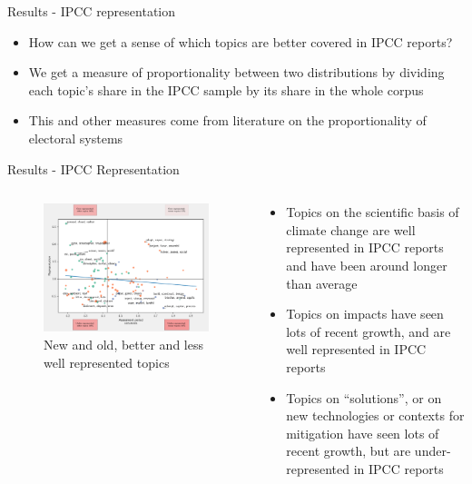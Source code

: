 \documentclass[9pt]{beamer}
\begin{document}
\begin{frame}{Results - IPCC representation}

\begin{itemize}
	\item<1-> How can we get a sense of which topics are better covered in IPCC reports?
	\item<2-> We get a measure of proportionality between two distributions by dividing each topic's share in the IPCC sample by its share in the whole corpus
	\item<3-> This and other measures come from literature on the proportionality of electoral systems \citep[e.g][]{Karpov2008}
\end{itemize}


\end{frame}

\begin{frame}{Results - IPCC Representation}

\begin{columns}
	\begin{column}{0.65\linewidth}
		\begin{figure}	
			\includegraphics[width=\linewidth]{../plots/ipcc_representation/ipcc_rep_new665_all.pdf}
			\caption{New and old, better and less well represented topics}
		\end{figure}
	\end{column}
	\begin{column}{0.35\linewidth}	
		\begin{center}
			\begin{itemize}
				\item<1-> Topics on the scientific basis of climate change are well represented in IPCC reports and have been around longer than average
				\item<2->Topics on impacts have seen lots of recent growth, and are well represented in IPCC reports
				\item<3->Topics on ``solutions'', or on new technologies or contexts for mitigation have seen lots of recent growth, but are under-represented in IPCC reports
			\end{itemize}
		\end{center}
	\end{column}
\end{columns}


\end{frame}
\end{document}
